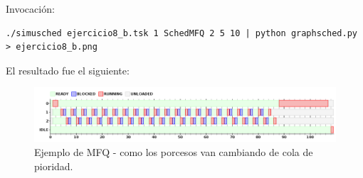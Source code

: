 Invocaci\'on:

\begin{framed}
\begin{verbatim}
./simusched ejercicio8_b.tsk 1 SchedMFQ 2 5 10 | python graphsched.py > ejercicio8_b.png
\end{verbatim}
\end{framed}

El resultado fue el siguiente:

\begin{figure}[h!]
  \caption{Ejemplo de MFQ - como los porcesos van cambiando de cola de pioridad.}
  \centering
    \includegraphics[width=1\textwidth]{img/ejercicio8_a.png}
\end{figure}

